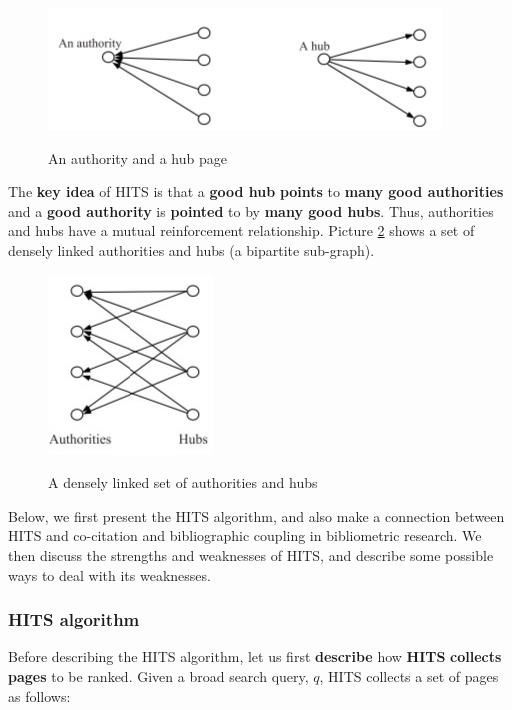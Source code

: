 \begin{figure}[h!]
		\centering
        \includegraphics[scale = 1.8]{img/authorative and hub.jpg}
		\label{auth and hub}
        \caption{An authority and a hub page}
\end{figure}

The \textbf{key idea} of HITS is that a \textbf{good hub} \textbf{points} to \textbf{many good authorities} and a \textbf{good authority} is \textbf{pointed} to by \textbf{many good hubs}. Thus, authorities and hubs have a mutual reinforcement relationship. Picture \ref{auth and hub2} shows a set of densely linked authorities and hubs (a bipartite sub-graph). 

\begin{figure}[h!]
		\centering
        \includegraphics[scale = 1.8]{img/authorative and hub2.jpg}
		\label{auth and hub2}
        \caption{A densely linked set of authorities and hubs}
\end{figure}

Below, we first present the HITS algorithm, and also make a connection between HITS and co-citation and bibliographic coupling in bibliometric research. We then discuss the strengths and weaknesses of HITS, and describe some possible ways to deal with its weaknesses.

\subsubsection{HITS algorithm}
Before describing the HITS algorithm, let us first \textbf{describe} how \textbf{HITS} \textbf{collects} \textbf{pages} to be ranked. Given a broad search query, $q$, HITS collects a set of pages as follows: 

